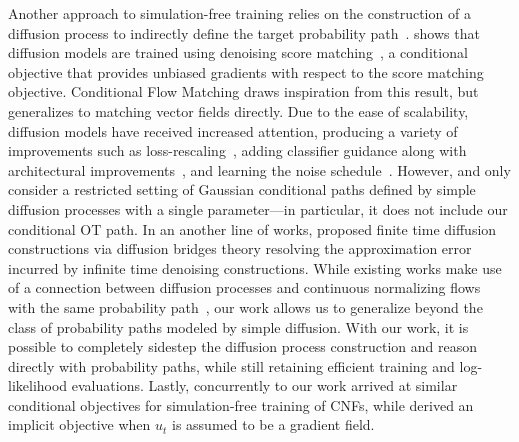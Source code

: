 \documentclass{article}
\begin{document}
Another approach to simulation-free training relies on the construction of a diffusion process to indirectly define the target probability path~\citep{sohl2015deep,ho2020denoising,song2019score}.
\citet{song2020score} shows that diffusion models are trained using denoising score matching~\citep{vincent2011connection}, a conditional objective that provides unbiased gradients with respect to the score matching objective. 
Conditional Flow Matching draws inspiration from this result, but generalizes to matching vector fields directly.
Due to the ease of scalability, diffusion models have received increased attention, producing a variety of improvements such as loss-rescaling~\citep{song2021maximum}, adding classifier guidance along with architectural improvements~\citep{dhariwal2021diffusion}, and learning the noise schedule~\citep{nichol2021improved,kingma2021vdm}. However, \citep{nichol2021improved} and \citep{kingma2021vdm} only consider a restricted setting of Gaussian conditional paths defined by simple diffusion processes with a single parameter---in particular, it does not include our conditional OT path.
%
{In an another line of works, \citep{DeBortoli2021schscore, wang2021schbridges,peluchetti2021non} proposed finite time diffusion constructions via diffusion bridges theory resolving the approximation error incurred by infinite time denoising constructions.}
%
While existing works make use of a connection between diffusion processes and continuous normalizing flows with the same probability path~\citep{maoutsa2020interacting,song2020score,song2021maximum}, our work allows us to generalize beyond the class of probability paths modeled by simple diffusion.
With our work, it is possible to completely sidestep the diffusion process construction and reason directly with probability paths, while still retaining efficient training and log-likelihood evaluations.  Lastly, concurrently to our work \citep{liu2022flow,albergo2022building} arrived at similar conditional objectives for simulation-free training of CNFs, while \citet{neklyudov2023action} derived an implicit objective when $u_t$ is assumed to be a gradient field.


\end{document}
